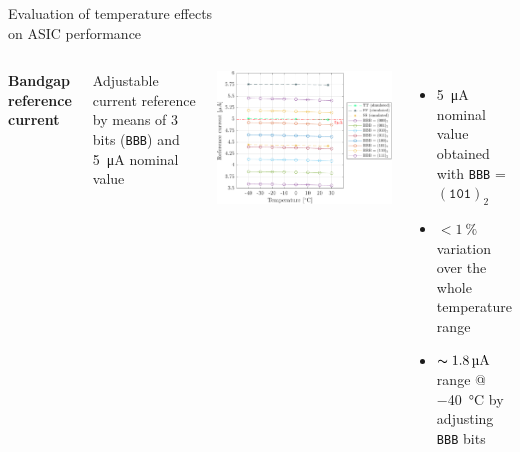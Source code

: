 \documentclass[aspectratio=169,xcolor=dvipsnames]{beamer}
\newcommand{\greencheck}{{\color{ForestGreen}\checkmark}}
\begin{document}
\begin{frame}{\vspace{-0.3cm} Evaluation of temperature effects \\ \vskip-0.15cm on ASIC performance}
\begin{columns}[T]
        \addtolength{\leftmargini}{\labelsep}
        \vskip0.3cm
        \textbf{Bandgap reference current}\\
        \vskip0.15cm
    
        Adjustable current reference by means of 3 bits (\texttt{BBB}) and \SI{5}{\micro\ampere} nominal value

        \vskip-0.4cm
        \begin{center}
            \includegraphics[height=0.48\textheight]{images/temperature_effects/BGR_current_Xtemp_all-BBB.pdf}
        \end{center}

        \vskip-0.2cm
        \begin{itemize}
            \item \SI{5}{\micro\ampere} nominal value obtained with \texttt{BBB} = $(\texttt{101})_{2}$ \greencheck
            \item $< \SI{1}{\percent}$ variation over the whole temperature range \greencheck
            \item $\thicksim \SI{1.8}{\micro\ampere}$ range @ \SI{-40}{\celsius} by adjusting \texttt{BBB} bits \greencheck
        \end{itemize}
    
    \end{columns}
\end{frame}
\end{document}
